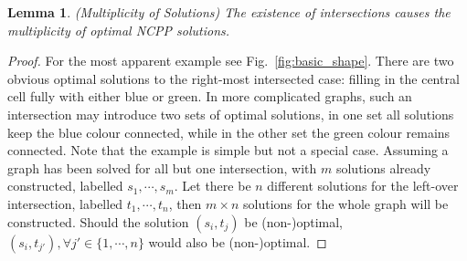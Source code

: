 \documentclass[journal]{IEEEtran}
\newtheorem{lemma}[theorem]{Lemma}
\begin{document}
\begin{lemma}
(Multiplicity of Solutions) The existence of intersections causes the multiplicity of optimal NCPP solutions. 
\end{lemma}
\begin{proof}
For the most apparent example see Fig.~\ref{fig:basic_shape}. There are two obvious optimal solutions to the right-most intersected case: 
filling in the central cell fully with either blue or green. 
In more complicated graphs, such an intersection may introduce two sets of optimal solutions, in one set all solutions keep the blue colour connected, 
while in the other set the green colour remains connected. Note that the example is simple but not a special case. Assuming a graph has been solved for all but one intersection, with $m$ solutions already constructed, labelled $s_1, \cdots, s_m$. Let there be $n$ different solutions for the left-over intersection, labelled $t_1, \cdots, t_n$, then $m\times n$ solutions for the whole graph will be constructed. 
Should the solution $(s_i, t_j)$ be (non-)optimal, $(s_i, t_{j'}), \forall j'\in \{1, \cdots, n\}$ would also be (non-)optimal. 
\end{proof}
\end{document}
